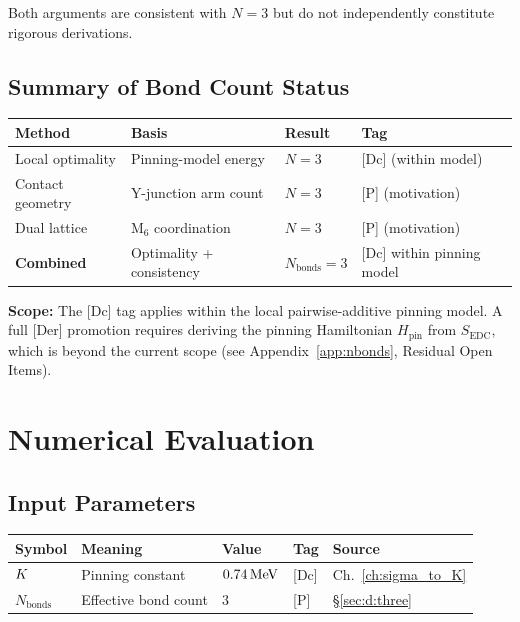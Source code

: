 Both arguments are consistent with $N = 3$ but do not independently
constitute rigorous derivations.

\subsection{Summary of Bond Count Status}

\begin{center}
\begin{tabular}{llll}
\toprule
\textbf{Method} & \textbf{Basis} & \textbf{Result} & \textbf{Tag} \\
\midrule
Local optimality & Pinning-model energy & $N = 3$ & [Dc] (within model) \\
Contact geometry & Y-junction arm count & $N = 3$ & [P] (motivation) \\
Dual lattice & M$_6$ coordination & $N = 3$ & [P] (motivation) \\
\midrule
\textbf{Combined} & Optimality + consistency & $N_{\text{bonds}} = 3$ &
    [Dc] within pinning model \\
\bottomrule
\end{tabular}
\end{center}

\textbf{Scope:} The [Dc] tag applies within the local pairwise-additive
pinning model. A full [Der] promotion requires deriving the pinning
Hamiltonian $H_{\text{pin}}$ from $S_{\text{EDC}}$, which is beyond
the current scope (see Appendix~\ref{app:nbonds}, Residual Open Items).

\section{Numerical Evaluation}
\label{sec:d:numerical}

\subsection{Input Parameters}

\begin{center}
\begin{tabular}{lllll}
\toprule
\textbf{Symbol} & \textbf{Meaning} & \textbf{Value} & \textbf{Tag} & \textbf{Source} \\
\midrule
$K$ & Pinning constant & $0.74\,\mathrm{MeV}$ & [Dc] & Ch.~\ref{ch:sigma_to_K} \\
$N_{\text{bonds}}$ & Effective bond count & $3$ & [P] & \S\ref{sec:d:three} \\
\bottomrule
\end{tabular}
\end{center}

